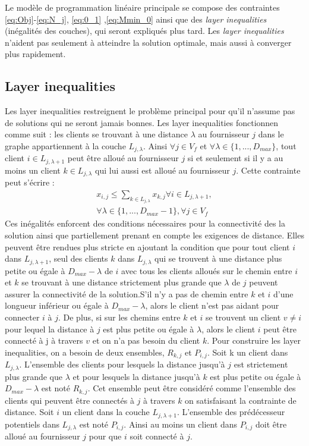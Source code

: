 \documentclass[12pt,a4paper]{article}
\begin{document}
\begin{multicols}{2}
Le modèle de programmation linéaire principale se compose des contraintes \eqref{eq:Obj}-\eqref{eq:N_j}, \eqref{eq:0_1} ,\eqref{eq:Mmin_0} ainsi que des \textit{layer inequalities} (inégalités des couches), qui seront expliqués plus tard. Les \textit{layer inequalities} n'aident pas seulement à atteindre la solution optimale, mais aussi à converger plus rapidement.
\subsection{Layer inequalities}
Les layer inequalities restreignent le problème principal pour qu'il n'assume pas de solutions qui ne seront jamais bonnes. Les layer inequalities fonctionnen comme suit : les clients se trouvant à une distance $\lambda$ au fournisseur $j$ dans le graphe appartiennent à la couche $L_{j,\lambda}$. Ainsi $\forall j \in V_{f}$ et $\forall \lambda \in \{1,...,D_{max} \}$, tout client $i \in L_{j,\lambda + 1}$ peut être alloué au fournisseur $j$ si et seulement si il y a au moins un client $k \in L_{j,\lambda}$ qui lui aussi est alloué au fournisseur $j$. Cette contrainte peut s'écrire : 
\begin{align*}
x_{i,j} \leq \sum_{k \in L_{j,\lambda} }{x_{k,j}} \forall i \in L_{j,\lambda +1},\\ \forall \lambda \in \{ 1,...,D_{max}-1 \}, \forall j \in V_{f}
\end{align*}
Ces inégalités enforcent des conditions nécessaires pour la connectivité des la solution ainsi que partiellement prenant en compte les exigences de distance. Elles peuvent être rendues plus stricte en ajoutant la condition que pour tout client $i$ dans $L_{j,\lambda +1}$, seul des clients $k$ dans $L_{j,\lambda}$ qui se trouvent à une distance plus petite ou égale à $D_{max}-\lambda$ de $i$ avec tous les clients alloués sur le chemin entre $i$ et $k$ se trouvant à une distance strictement plus grande que $\lambda$ de $j$ peuvent assurer la connectivité de la solution.S'il n'y a pas de chemin entre $k$ et $i$ d'une longueur inférieur ou égale à $D_{max}-\lambda$, alors le client n'est pas aidant pour connecter $i$ à $j$. De plus, si sur les chemins entre $k$ et $i$ se trouvent un client $v \neq i$ pour lequel la distance à $j$ est plus petite ou égale à $\lambda$, alors le client $i$ peut être connecté à j à travers $v$ et on n'a pas besoin du client $k$.\newline \indent
Pour construire les layer inequalities, on a besoin de deux ensembles, $R_{k,j}$ et $P_{i,j}$. Soit k un client dans $L_{j,\lambda}$. L'ensemble des clients pour lesquels la distance jusqu'à $j$ est strictement plus grande que $\lambda$ et pour lesquels la distance jusqu'à $k$ est plus petite ou égale à $D_{max}-\lambda$ est noté $R_{k,j}$. Cet ensemble peut être considéré comme l'ensemble des clients qui peuvent être connectés à $j$ à travers $k$ on satisfaisant la contrainte de distance. Soit $i$ un client dans la couche $L_{j,\lambda +1}$. L'ensemble des prédécesseur potentiels dans $L_{j,\lambda}$ est noté $P_{i,j}$. Ainsi au moins un client dans $P_{i,j}$ doit être alloué au fournisseur $j$ pour que $i$ soit connecté à $j$.\newline\indent

\end{multicols}
\end{document}
